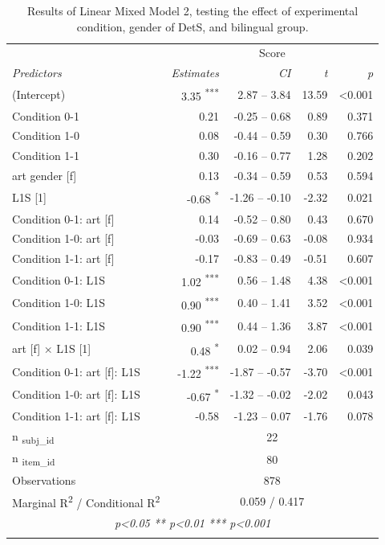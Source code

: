 \documentclass[output=paper]{langscibook}
\begin{document}
\begin{table}
\begin{tabularx}{\textwidth}{Xrrrr}
\lsptoprule
{  } & \multicolumn{4}{c}{{ Score}}\\
{ \textit{Predictors}} & { \textit{Estimates}} & { \textit{CI}} & { \textit{t}} & { \textit{p}}\\
\midrule
  (Intercept)  &   3.35 \textsuperscript{***}   &   2.87 – 3.84  &   13.59  &   <0.001 \\
 Condition 0-1 &  0.21 &  -0.25 – 0.68 &  0.89 &  0.371\\
 Condition 1-0 &  0.08 &  -0.44 – 0.59 &  0.30 &  0.766\\
 Condition 1-1 &  0.30 &  -0.16 – 0.77 &  1.28 &  0.202\\
 art gender [f] &  0.13 &  -0.34 – 0.59 &  0.53 &  0.594\\
  L1S [1]  &     -0.68 \textsuperscript{*}   &     -1.26 – -0.10  &     -2.32  &   0.021 \\
 Condition 0-1: art [f] &  0.14 &  -0.52 – 0.80 &  0.43 &  0.670\\
 Condition 1-0: art [f] &  -0.03 &  -0.69 – 0.63 &  -0.08 &  0.934\\
 Condition 1-1: art [f] &  -0.17 &  -0.83 – 0.49 &  -0.51 &  0.607\\
  Condition 0-1: L1S  &   1.02 \textsuperscript{***}   &   0.56 – 1.48  &   4.38  &   <0.001 \\
  Condition 1-0: L1S  &   0.90 \textsuperscript{***}   &   0.40 – 1.41  &   3.52  &   <0.001 \\
  Condition 1-1: L1S  &   0.90 \textsuperscript{***}   &   0.44 – 1.36  &   3.87  &   <0.001 \\
  art [f] × L1S [1]  &   0.48 \textsuperscript{*}   &   0.02 – 0.94  &   2.06  &   0.039 \\
  Condition 0-1: art [f]: L1S  &     -1.22 \textsuperscript{***}   &     -1.87 – -0.57  &     -3.70  &   <0.001 \\
  Condition 1-0: art [f]: L1S  &     -0.67 \textsuperscript{*  } &     -1.32 – -0.02  &     -2.02  &   0.043 \\
  Condition 1-1: art [f]: L1S  &     -0.58  &     -1.23 – 0.07  &     -1.76  &   0.078 \\
{ n \textsubscript{subj\_id}} & \multicolumn{4}{c}{{ 22}}\\
{ n \textsubscript{item\_id}} & \multicolumn{4}{c}{{ 80}}\\
{ Observations} & \multicolumn{4}{c}{{ 878}}\\
{ Marginal R\textsuperscript{2} / Conditional R\textsuperscript{2}} & \multicolumn{4}{c}{{ 0.059 / 0.417}}\\
\multicolumn{5}{c}{{ \textit{p<0.05   ** p<0.01   *** p<0.001}}}\\
\lspbottomrule
\end{tabularx}

\caption{Results of Linear Mixed Model 2, testing the effect of experimental condition, gender of DetS, and bilingual group.}
\label{tab:ezeiza:6}
\end{table}
\end{document}

